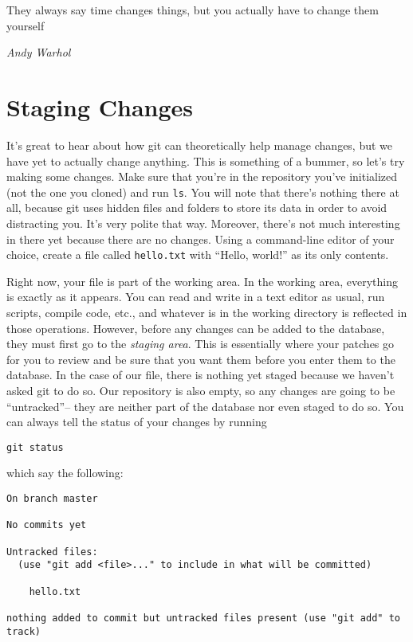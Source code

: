 \epigraph{They always say time changes things, but you actually have to change
them yourself}{\textit{Andy Warhol}}

\section{Staging Changes}
\par{
It's great to hear about how git can theoretically help manage changes, but we
have yet to actually change anything. This is something of a bummer, so let's
try making some changes. Make sure that you're in the repository you've
initialized (not the one you cloned) and run \verb+ls+. You will note that
there's nothing there at all, because git uses hidden files and folders to
store its data in order to avoid distracting you. It's very polite that way.
Moreover, there's not much interesting in there yet because there are no
changes. Using a command-line editor of your choice, create a file called
\verb+hello.txt+ with ``Hello, world!'' as its only contents.
}

\par{
Right now, your file is part of the working area. In the working area,
everything is exactly as it appears. You can read and write in a text editor
as usual, run scripts, compile code, etc., and whatever is in the working
directory is reflected in those operations. However, before any changes can be
added to the database, they must first go to the \emph{staging area}. This is
essentially where your patches go for you to review and be sure that you want
them before you enter them to the database. In the case of our file, there is
nothing yet staged because we haven't asked git to do so. Our repository is
also empty, so any changes are going to be ``untracked''-- they are neither
part of the database nor even staged to do so. You can always tell the status
of your changes by running
}

\begin{verbatim}
git status
\end{verbatim}

\par{
which say the following:
}

\begin{verbatim}
On branch master

No commits yet

Untracked files:
  (use "git add <file>..." to include in what will be committed)

	hello.txt

nothing added to commit but untracked files present (use "git add" to track)
\end{verbatim}


